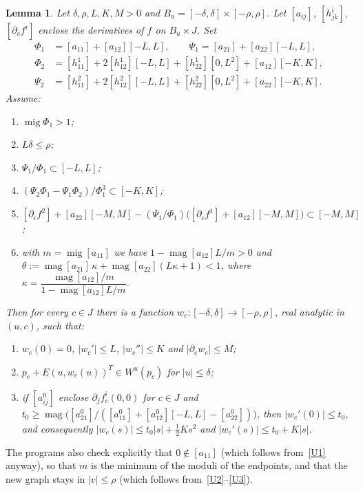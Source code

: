 \documentclass[11pt]{amsart}
\newtheorem{lemma}[thm]{Lemma}
\theoremstyle{definition}
\theoremstyle{remark}
\newcommand{\magn}{\operatorname{mag}}
\newcommand{\mig}{\operatorname{mig}}
\newcommand{\ival}[1]{[#1]}
\newcommand{\Wu}{W^u}
\begin{document}
\begin{lemma}\label{lem:Wu}
Let $\delta,\rho,L,K,M>0$ and $B_u=[-\delta,\delta]\times[-\rho,\rho]$. Let $\ival{a_{ij}}$,
$\ival{h^i_{jk}}$, $\ival{\partial_cf^i}$ enclose the derivatives of $f$ on $B_u\times J$. Set
\begin{align*}
\Phi_1&=\ival{a_{11}}+\ival{a_{12}}[-L,L],\qquad
\Psi_1=\ival{a_{21}}+\ival{a_{22}}[-L,L],\\
\Phi_2&=\ival{h^1_{11}}+2\ival{h^1_{12}}[-L,L]+\ival{h^1_{22}}[0,L^2]+\ival{a_{12}}[-K,K],\\
\Psi_2&=\ival{h^2_{11}}+2\ival{h^2_{12}}[-L,L]+\ival{h^2_{22}}[0,L^2]+\ival{a_{22}}[-K,K].
\end{align*}
Assume:
\begin{enumerate}[label=\textup{(U\arabic*)},leftmargin=*]
\item\label{U1} $\mig\Phi_1>1$;
\item\label{U2} $L\delta\le\rho$;
\item\label{U3} $\Psi_1/\Phi_1\subset[-L,L]$;
\item\label{U4} $(\Psi_2\Phi_1-\Psi_1\Phi_2)/\Phi_1^3\subset[-K,K]$;
\item\label{U5} $\ival{\partial_cf^2}+\ival{a_{22}}[-M,M]-(\Psi_1/\Phi_1)\bigl(\ival{\partial_cf^1}+\ival{a_{12}}[-M,M]\bigr)\subset[-M,M]$;
\item\label{U6} with $m=\mig\ival{a_{11}}$ we have $1-\magn\ival{a_{12}}L/m>0$ and
$\theta:=\magn\ival{a_{21}}\,\kappa+\magn\ival{a_{22}}(L\kappa+1)<1$, where
$\kappa=\dfrac{\magn\ival{a_{12}}/m}{1-\magn\ival{a_{12}}L/m}$.
\end{enumerate}
Then for every $c\in J$ there is a function $w_c\colon[-\delta,\delta]\to[-\rho,\rho]$, real analytic in
$(u,c)$, such that:
\begin{enumerate}[label=\textup{(\alph*)}]
\item $w_c(0)=0$, $|w_c'|\le L$, $|w_c''|\le K$ and $|\partial_c w_c|\le M$;
\item $p_c+E(u,w_c(u))^T\in\Wu(p_c)$ for $|u|\le\delta$;
\item if $\ival{a^0_{ij}}$ enclose $\partial_jf^i_c(0,0)$ for $c\in J$ and
$t_0\ge\magn\bigl(\ival{a^0_{21}}/(\ival{a^0_{11}}+\ival{a^0_{12}}[-L,L]-\ival{a^0_{22}})\bigr)$, then
$|w_c'(0)|\le t_0$, and consequently $|w_c(s)|\le t_0|s|+\tfrac12Ks^2$ and $|w_c'(s)|\le t_0+K|s|$.
\end{enumerate}
\end{lemma}

The programs also check explicitly that $0\notin\ival{a_{11}}$ (which follows from~\ref{U1} anyway), so
that $m$ is the minimum of the moduli of the endpoints, and that the new graph stays in $|v|\le\rho$
(which follows from~\ref{U2}--\ref{U3}).
\end{document}
